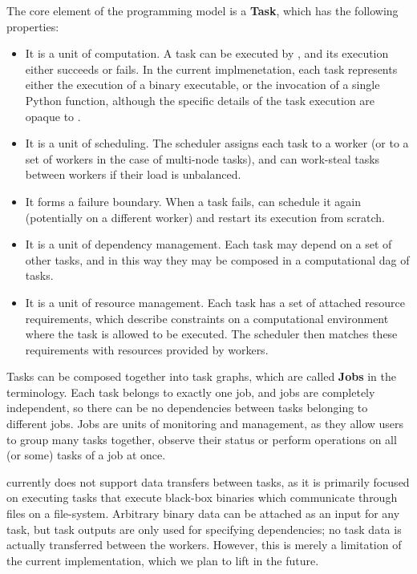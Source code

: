 The core element of the programming model is a \textbf{Task}, which has the following
properties:
\begin{itemize}
	\item It is a unit of computation. A task can be executed by \hq{}, and its execution
	      either succeeds or fails. In the current implmenetation, each task represents either the execution
	      of a binary executable, or the invocation of a single Python function, although the specific
	      details of the task execution are opaque to \hyperqueue{}.
	\item It is a unit of scheduling. The \hq{} scheduler assigns each task to a worker (or
	      to a set of workers in the case of multi-node tasks), and can work-steal tasks between workers if
	      their load is unbalanced.
	\item It forms a failure boundary. When a task fails, \hq{} can schedule it again
	      (potentially on a different worker) and restart its execution from scratch.
	\item It is a unit of dependency management. Each task may depend on a set of other tasks, and in this
	      way they may be composed in a computational \gls{dag} of tasks.
	\item It is a unit of resource management. Each task has a set of attached resource requirements, which
	      describe constraints on a computational environment where the task is allowed to be executed. The
	      \hq{} scheduler then matches these requirements with resources provided by
	      workers.
\end{itemize}

Tasks can be composed together into task graphs, which are called \textbf{Jobs} in the
\hq{} terminology. Each task belongs to exactly one job, and jobs are completely
independent, so there can be no dependencies between tasks belonging to different jobs. Jobs are
units of monitoring and management, as they allow users to group many tasks together, observe their
status or perform operations on all (or some) tasks of a job at once.

\hyperqueue{} currently does not support data transfers between tasks, as it is primarily
focused on executing tasks that execute black-box binaries which communicate through files on a
file-system. Arbitrary binary data can be attached as an input for any task, but task outputs are
only used for specifying dependencies; no task data is actually
transferred between the workers. However, this is merely a limitation of the current
implementation, which we plan to lift in the future.  %

